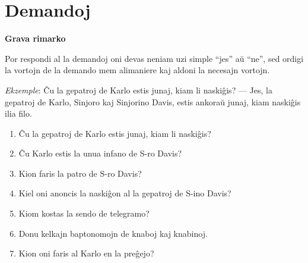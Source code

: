 \newpage

\section*{Demandoj}

\textbf{Grava rimarko}

\noindent Por respondi al la demandoj oni devas neniam uzi simple ``jes'' aŭ ``ne'', sed ordigi la vortojn de la demando mem alimaniere kaj aldoni la necesajn vortojn.

\emph{Ekzemple}: Ĉu la gepatroj de Karlo estis junaj, kiam li naskiĝis? — Jes, la gepatroj de Karlo, Sinjoro kaj Sinjorino Davis, estis ankoraŭ junaj, kiam naskiĝis ilia filo.

\begin{enumerate}
    \item Ĉu la gepatroj de Karlo estis junaj, kiam li naskiĝis?
    \item Ĉu Karlo estis la unua infano de S-ro Davis?
    \item Kion faris la patro de S-ro Davis?
    \item Kiel oni anoncis la naskiĝon al la gepatroj de S-ino Davis?
    \item Kiom kostas la sendo de telegramo?
    \item Donu kelkajn baptonomojn de knaboj kaj knabinoj.
    \item Kion oni faris al Karlo en la preĝejo?
\end{enumerate}
